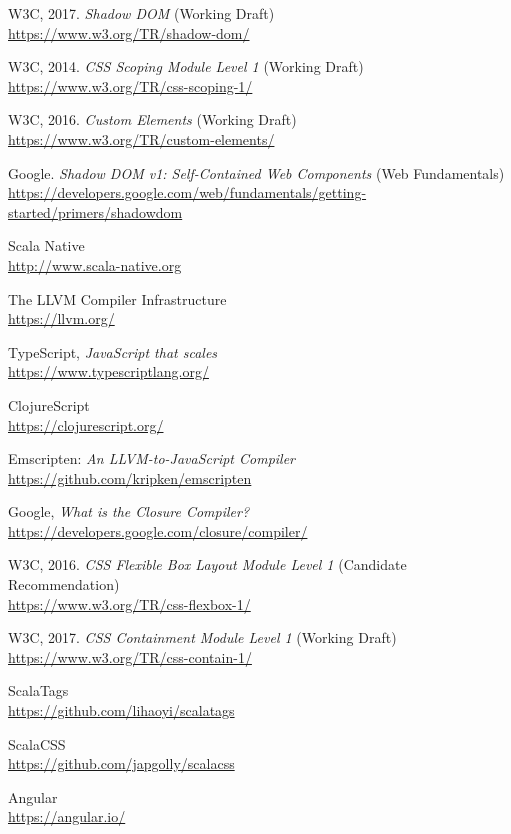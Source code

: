 \begin{thebibliography}{99}
W3C, 2017. \emph{Shadow DOM} (Working Draft)\\
\url{https://www.w3.org/TR/shadow-dom/}

W3C, 2014. \emph{CSS Scoping Module Level 1} (Working Draft)\\
\url{https://www.w3.org/TR/css-scoping-1/}

W3C, 2016. \emph{Custom Elements} (Working Draft)\\
\url{https://www.w3.org/TR/custom-elements/}

Google. \emph{Shadow DOM v1: Self-Contained Web Components} (Web Fundamentals)\\
\url{https://developers.google.com/web/fundamentals/getting-started/primers/shadowdom}

Scala Native\\
\url{http://www.scala-native.org}

The LLVM Compiler Infrastructure\\
\url{https://llvm.org/}

TypeScript, \emph{JavaScript that scales}\\
\url{https://www.typescriptlang.org/}

ClojureScript\\
\url{https://clojurescript.org/}

Emscripten: \emph{An LLVM-to-JavaScript Compiler}\\
\url{https://github.com/kripken/emscripten}

Google, \emph{What is the Closure Compiler?}\\
\url{https://developers.google.com/closure/compiler/}

W3C, 2016. \emph{CSS Flexible Box Layout Module Level 1} (Candidate Recommendation)\\
\url{https://www.w3.org/TR/css-flexbox-1/}

W3C, 2017. \emph{CSS Containment Module Level 1} (Working Draft)\\
\url{https://www.w3.org/TR/css-contain-1/}

ScalaTags\\
\url{https://github.com/lihaoyi/scalatags}

ScalaCSS\\
\url{https://github.com/japgolly/scalacss}

Angular\\
\url{https://angular.io/}

\end{thebibliography}